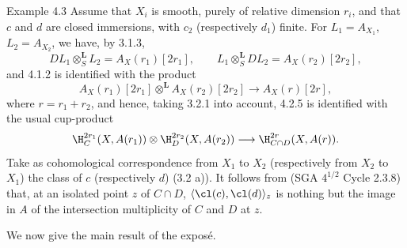 \begin{statement}{Example 4.3}
Assume that $X_i$ is smooth, purely of relative dimension $r_i$, and that $c$ and $d$ are closed immersions, with $c_2$ (respectively $d_1$) finite. For $L_1=A_{X_1}$, $L_2=A_{X_2}$, we have, by 3.1.3,
\[
DL_1\otimes_S^{\mathbf L}L_2=A_X(r_1)[2r_1],\qquad
L_1\otimes_S^{\mathbf L}DL_2=A_X(r_2)[2r_2],
\]
and 4.1.2 is identified with the product
\[
A_X(r_1)[2r_1]\otimes^{\mathbf L}A_X(r_2)[2r_2]\longrightarrow A_X(r)[2r],
\]
where $r=r_1+r_2$, and hence, taking 3.2.1 into account, 4.2.5 is identified with the usual cup-product
\[
\H_C^{2r_1}(X,A(r_1))\otimes \H_D^{2r_2}(X,A(r_2))
\longrightarrow
\H_{C\cap D}^{2r}(X,A(r)).
\]
Take as cohomological correspondence from $X_1$ to $X_2$ (respectively from $X_2$ to $X_1$) the class of $c$ (respectively $d$) (3.2 a)). It follows from (SGA $4^{1/2}$ Cycle 2.3.8) that, at an isolated point $z$ of $C\cap D$, $\langle \cl(c),\cl(d)\rangle_z$ is nothing but the image in $A$ of the intersection multiplicity of $C$ and $D$ at $z$.
\end{statement}

We now give the main result of the exposé.

